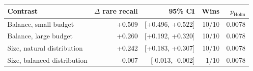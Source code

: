 \begin{tabular}{@{}lrrrr@{}}
\toprule
Contrast & $\Delta$ rare recall & 95\% CI & Wins & $p_{\mathrm{Holm}}$ \\
\midrule
Balance, small budget & +0.509 & [+0.496, +0.522] & 10/10 & 0.0078 \\
Balance, large budget & +0.260 & [+0.192, +0.320] & 10/10 & 0.0078 \\
Size, natural distribution & +0.242 & [+0.183, +0.307] & 10/10 & 0.0078 \\
Size, balanced distribution & -0.007 & [-0.013, -0.002] & 1/10 & 0.0078 \\
\bottomrule
\end{tabular}